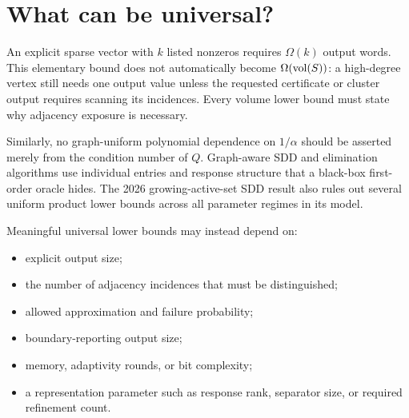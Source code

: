 \section{What can be universal?}
\label{sec:universal}

An explicit sparse vector with $k$ listed nonzeros requires $\Omega(k)$ output
words.  This elementary bound does not automatically become
$\Omega(\operatorname{vol}(S))$: a high-degree vertex still needs one output value unless
the requested certificate or cluster output requires scanning its incidences.
Every volume lower bound must state why adjacency exposure is necessary.

Similarly, no graph-uniform polynomial dependence on $1/\alpha$ should be
asserted merely from the condition number of $Q$.  Graph-aware SDD and
elimination algorithms use individual entries and response structure that a
black-box first-order oracle hides.  The 2026 growing-active-set SDD result also
rules out several uniform product lower bounds across all parameter regimes in
its model.

Meaningful universal lower bounds may instead depend on:

\begin{itemize}
\item explicit output size;
\item the number of adjacency incidences that must be distinguished;
\item allowed approximation and failure probability;
\item boundary-reporting output size;
\item memory, adaptivity rounds, or bit complexity;
\item a representation parameter such as response rank, separator size, or
      required refinement count.
\end{itemize}
